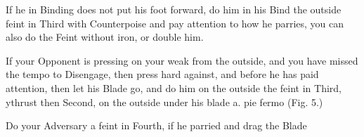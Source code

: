\exercise{}
If he in Binding does not put his foot forward, do him in his Bind the
outside feint in Third with Counterpoise and pay attention to how he
parries, you can also do the Feint without iron, or double him.


\exercise{}
If your Opponent is pressing on your weak from the outside, and you have missed the tempo to Disengage, then press hard against, and before he has paid attention, then let his Blade go, and do him on the outside the feint in Third, ythrust then Second, on the outside under his blade a. pie fermo (Fig. 5.)

Do your Adversary a feint in Fourth, if he parried and drag the Blade
